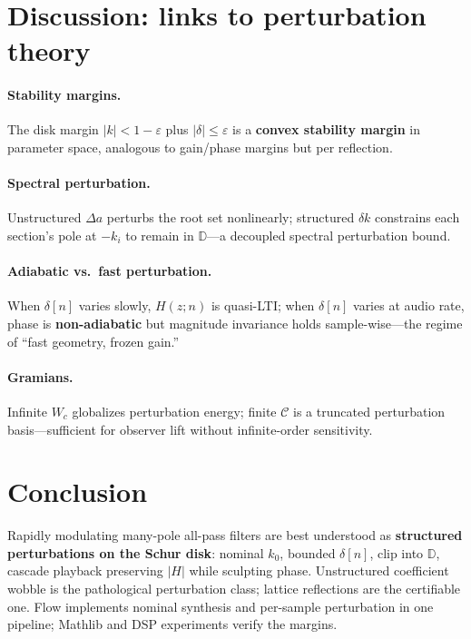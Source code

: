 \documentclass[11pt]{article}
\begin{document}
\section{Discussion: links to perturbation theory}

\paragraph{Stability margins.} The disk margin $|k|<1-\varepsilon$ plus $|\delta|\le\varepsilon$ is a \textbf{convex stability margin} in parameter space, analogous to gain/phase margins but per reflection.

\paragraph{Spectral perturbation.} Unstructured $\Delta a$ perturbs the root set nonlinearly; structured $\delta k$ constrains each section's pole at $-k_i$ to remain in $\mathbb{D}$---a decoupled spectral perturbation bound.

\paragraph{Adiabatic vs.\ fast perturbation.} When $\delta[n]$ varies slowly, $H(z;n)$ is quasi-LTI; when $\delta[n]$ varies at audio rate, phase is \textbf{non-adiabatic} but magnitude invariance holds sample-wise---the regime of ``fast geometry, frozen gain.''

\paragraph{Gramians.} Infinite $W_c$ globalizes perturbation energy; finite $\mathcal{C}$ is a truncated perturbation basis---sufficient for observer lift without infinite-order sensitivity.

\section{Conclusion}

Rapidly modulating many-pole all-pass filters are best understood as \textbf{structured perturbations on the Schur disk}: nominal $k_0$, bounded $\delta[n]$, clip into $\mathbb{D}$, cascade playback preserving $|H|$ while sculpting phase. Unstructured coefficient wobble is the pathological perturbation class; lattice reflections are the certifiable one. Flow implements nominal synthesis and per-sample perturbation in one pipeline; Mathlib and DSP experiments verify the margins.
\end{document}
